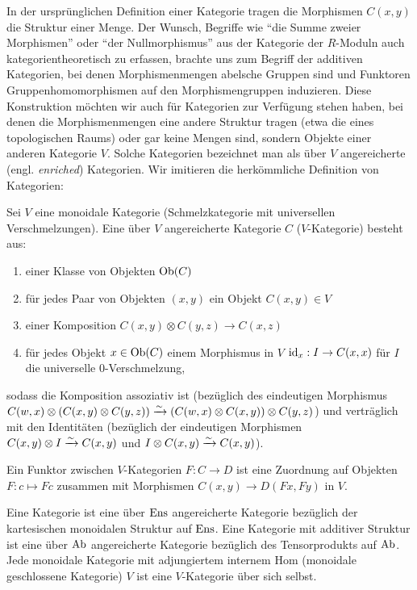 In der ursprünglichen Definition einer Kategorie tragen die Morphismen
$C(x, y)$ die Struktur einer Menge. Der Wunsch, Begriffe wie ``die
Summe zweier Morphismen'' oder ``der Nullmorphismus'' aus der
Kategorie der $R$-Moduln auch kategorientheoretisch zu erfassen,
brachte uns zum Begriff der additiven Kategorien, bei denen
Morphismenmengen abelsche Gruppen sind und Funktoren
Gruppenhomomorphismen auf den Morphismengruppen induzieren. Diese
Konstruktion möchten wir auch für Kategorien zur Verfügung stehen
haben, bei denen die Morphismenmengen eine andere Struktur tragen
(etwa die eines topologischen Raums) oder gar keine Mengen sind,
sondern Objekte einer anderen Kategorie $V$. Solche Kategorien
bezeichnet man als über $V$ angereicherte (engl. \emph{enriched})
Kategorien. Wir imitieren die herkömmliche Definition von Kategorien:
\begin{defn}
  Sei $V$ eine monoidale Kategorie (Schmelzkategorie mit universellen
  Verschmelzungen). Eine über $V$ angereicherte Kategorie $C$
  ($V$-Kategorie) besteht aus:
  \begin{enumerate}
  \item einer Klasse von Objekten $\operatorname{Ob}(C)$
  \item für jedes Paar von Objekten $(x, y)$ ein Objekt $C(x,y) \in V$
  \item einer Komposition $C(x, y) \otimes C(y, z) \to C(x, z)$
  \item für jedes Objekt $x \in \operatorname{Ob}(C)$ einem Morphismus in $V$
    $\operatorname{id}_x: I \to C(x, x)$ für $I$ die universelle 0-Verschmelzung,
  \end{enumerate}
  sodass die Komposition assoziativ ist (bezüglich des eindeutigen
  Morphismus $C(w,x) \otimes (C(x,y) \otimes C(y,z)) \xrightarrow[]{\sim} (C(w,x)
  \otimes C(x,y)) \otimes C(y,z)$) und verträglich mit den Identitäten
  (bezüglich der eindeutigen Morphismen $C(x, y) \otimes I \xrightarrow[]{\sim} C(x,
  y)$ und $I \otimes C(x,y) \xrightarrow[]{\sim} C(x,y)$).

  Ein Funktor zwischen $V$-Kategorien $F: C \to D$ ist eine Zuordnung
  auf Objekten $F: c \mapsto Fc$ zusammen mit Morphismen $C(x, y) \to
  D(Fx, Fy)$ in $V$.
\end{defn}
\begin{bsp}
  Eine Kategorie ist eine über $\operatorname{Ens}$ angereicherte Kategorie
  bezüglich der kartesischen monoidalen Struktur auf $\operatorname{Ens}$. Eine
  Kategorie mit additiver Struktur ist eine über $\operatorname{Ab}$ angereicherte
  Kategorie bezüglich des Tensorprodukts auf $\operatorname{Ab}$. Jede monoidale
  Kategorie mit adjungiertem internem Hom (monoidale geschlossene
  Kategorie) $V$ ist eine $V$-Kategorie über sich selbst.
\end{bsp}

